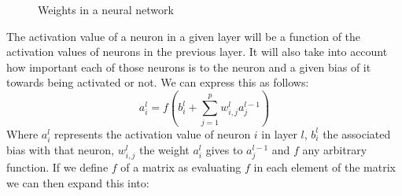 \documentclass[a4paper, 12pt]{amsart}
\begin{document}
\begin{figure}[!ht]
  \centering
  \def\layersep{2.5cm}

  \caption{Weights in a neural network}
  \label{fig:weights in a neural network}
\end{figure}

The activation value of a neuron in a given layer will be a function of the
activation values of neurons in the previous layer. It will also take into
account how important each of those neurons is to the neuron and a given bias of
it towards being activated or not. We can express this as follows:
\begin{equation*}
  a^l_i = f(b^l_i+\sum_{j=1}^{p}w^l_{i,j}a^{l-1}_j)
\end{equation*}
Where $a^l_i$ represents the activation value of neuron $i$ in layer $l$,
$b^l_i$ the associated bias with that neuron, $w^l_{i,j}$ the weight $a^l_i$
gives to $a^{l-1}_j$ and $f$ any arbitrary function. If we define $f$ of a
matrix as evaluating $f$ in each element of the matrix we can then expand this
into:
\end{document}
